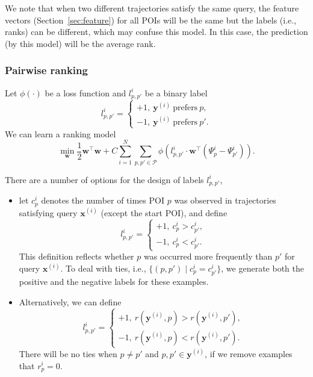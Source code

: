 We note that when two different trajectories satisfy the same query, the feature vectors (Section~\ref{sec:feature}) for all POIs will be the same 
but the labels (i.e., ranks) can be different, which may confuse this model. In this case, the prediction (by this model) will be the average rank.




\subsubsection{Pairwise ranking}
\label{sec:rank}

Let $\phi(\cdot)$ be a loss function and $l_{p,p'}^i$ be a binary label
\begin{equation*}
l_{p,p'}^i = \begin{cases}
+1,~ \mathbf{y}^{(i)} ~\text{prefers}~ p, \\
-1,~ \mathbf{y}^{(i)} ~\text{prefers}~ p'.
\end{cases}
\end{equation*}
We can learn a ranking model
\begin{equation*}
\min_{\mathbf{w}} \frac{1}{2} \mathbf{w}^\top \mathbf{w} +  
C \sum_{i=1}^N \sum_{p, p' \in \mathcal{P}} \phi \left( l_{p,p'}^i \cdot \mathbf{w}^\top (\Psi_p^i - \Psi_{p'}^i) \right).
\end{equation*}

There are a number of options for the design of labels $l_{p,p'}^i$,
\begin{itemize}
\item let $c_p^i$ denotes the number of times POI $p$ was observed in trajectories satisfying query $\mathbf{x}^{(i)}$ (except the start POI), and define
      \begin{equation*}
      l_{p,p'}^i = \begin{cases}
      +1,~ c_p^i > c_{p'}^i, \\
      -1,~ c_p^i < c_{p'}^i.
      \end{cases}
      \end{equation*}
      This definition reflects whether $p$ was occurred more frequently than $p'$ for query $\mathbf{x}^{(i)}$.
      To deal with ties, i.e., $\{(p, p') \mid c_p^i = c_{p'}^i\}$, we generate both the positive and the negative labels for these examples.
\item Alternatively, we can define
      \begin{equation*}
      l_{p,p'}^i = \begin{cases}
      +1,~ r(\mathbf{y}^{(i)}, p) > r(\mathbf{y}^{(i)}, p'), \\
      -1,~ r(\mathbf{y}^{(i)}, p) < r(\mathbf{y}^{(i)}, p').
      \end{cases}
      \end{equation*}
      There will be no ties when $p \ne p'$ and $p, p' \in \mathbf{y}^{(i)}$, if we remove examples that $r_p^i = 0$.
\end{itemize}


